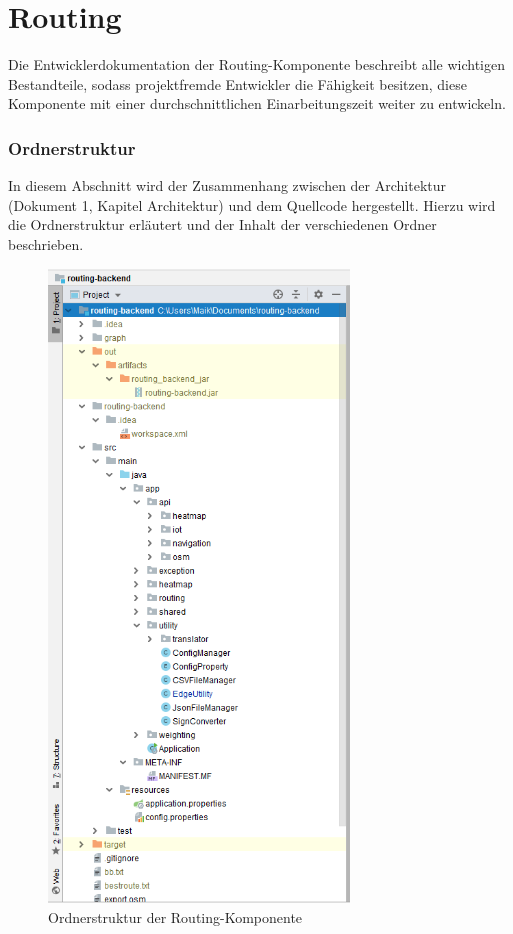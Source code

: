 \section{Routing}
Die Entwicklerdokumentation der Routing-Komponente beschreibt alle wichtigen Bestandteile, sodass projektfremde Entwickler die Fähigkeit besitzen, diese Komponente mit einer durchschnittlichen Einarbeitungszeit weiter zu entwickeln.

\subsubsection{Ordnerstruktur}
In diesem Abschnitt wird der Zusammenhang zwischen der Architektur (Dokument 1, Kapitel Architektur) und dem Quellcode hergestellt. Hierzu wird die Ordnerstruktur erläutert und der Inhalt der verschiedenen Ordner beschrieben.

\begin{figure}[!hb]
	\centering
	\includegraphics[width=8cm]{./ressourcen/routing/Ordnerstruktur-Routing.png}
	\caption{Ordnerstruktur der Routing-Komponente}
	\label{fig:folderstructure-routing}
\end{figure}

